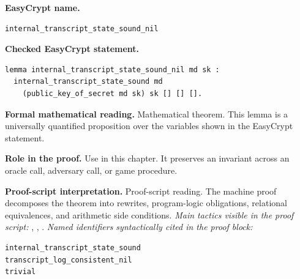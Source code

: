 \begin{formaltheorem}
\noindent\textbf{EasyCrypt name.}
\begin{lstlisting}[language=EasyCrypt,basicstyle=\ttfamily\scriptsize]
internal_transcript_state_sound_nil
\end{lstlisting}
\noindent\textbf{Checked EasyCrypt statement.}
\begin{lstlisting}[language=EasyCrypt,basicstyle=\ttfamily\scriptsize]
lemma internal_transcript_state_sound_nil md sk :
  internal_transcript_state_sound md
    (public_key_of_secret md sk) sk [] [] [].
\end{lstlisting}
\noindent\textbf{Formal mathematical reading.}
Mathematical theorem. This lemma is a universally quantified proposition over the variables shown in the EasyCrypt statement.

\noindent\textbf{Role in the proof.}
Use in this chapter. It preserves an invariant across an oracle call, adversary call, or game procedure.

\noindent\textbf{Proof-script interpretation.}
Proof-script reading. The machine proof decomposes the theorem into rewrites, program-logic obligations, relational equivalences, and arithmetic side conditions.
\emph{Main tactics visible in the proof script:} , , .
\emph{Named identifiers syntactically cited in the proof block:}
\begin{lstlisting}[language=EasyCrypt,basicstyle=\ttfamily\scriptsize]
internal_transcript_state_sound
transcript_log_consistent_nil
trivial
\end{lstlisting}

\end{formaltheorem}

